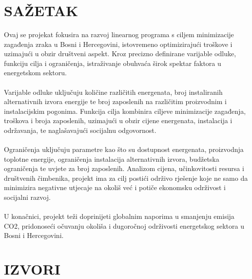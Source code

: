 \documentclass[12pt, a4paper]{paper}
\begin{document}
\newpage
\section*{SAŽETAK}

\paragraph{}
Ovaj se projekat fokusira na razvoj linearnog programa s ciljem minimizacije zagađenja zraka u Bosni i Hercegovini, istovremeno optimizirajući troškove i uzimajući u obzir društveni aspekt. Kroz precizno definirane varijable odluke, funkciju cilja i ograničenja, istraživanje obuhvaća širok spektar faktora u energetskom sektoru.

\paragraph{}
Varijable odluke uključuju količine različitih energenata, broj instaliranih alternativnih izvora energije te broj zaposlenih na različitim proizvodnim i instalacijskim pogonima. Funkcija cilja kombinira ciljeve minimizacije zagađenja, troškova i broja zaposlenih, uzimajući u obzir cijene energenata, instalacija i održavanja, te naglašavajući socijalnu odgovornost.

\paragraph{}
Ograničenja uključuju parametre kao što su dostupnost energenata, proizvodnja toplotne energije, ograničenja instalacija alternativnih izvora, budžetska ograničenja te uvjete za broj zaposlenih. Analizom cijena, učinkovitosti resursa i društvenih čimbenika, projekt ima za cilj postići održivo rješenje koje ne samo da minimizira negativne utjecaje na okoliš već i potiče ekonomsku održivost i socijalni razvoj.

\paragraph{}
U konačnici, projekt teži doprinijeti globalnim naporima u smanjenju emisija CO2, pridonoseći očuvanju okoliša i dugoročnoj održivosti energetskog sektora u Bosni i Hercegovini.

\newpage
\section*{IZVORI}
\end{document}
